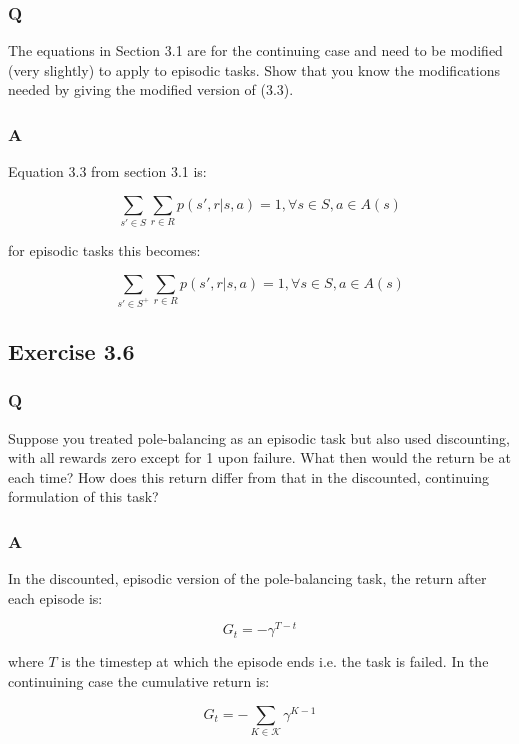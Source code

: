 \subsubsection*{Q}
The equations in Section 3.1 are for the continuing case and need to be modified (very slightly) to apply to episodic tasks. Show that you know the modifications needed by giving the modified version of (3.3). 

\subsubsection*{A}
Equation 3.3 from section 3.1 is:

\begin{equation}
	\sum_{s' \in S} \sum_{r \in R} p(s', r | s, a) = 1, \forall s \in S, a \in A(s)
\end{equation}

for episodic tasks this becomes:

\begin{equation}
\sum_{s' \in S^+} \sum_{r \in R} p(s', r | s, a) = 1, \forall s \in S, a \in A(s)
\end{equation}

\subsection{Exercise 3.6}
\subsubsection*{Q}
Suppose you treated pole-balancing as an episodic task but also used discounting, with all rewards zero except for 1 upon failure. What then would the return be at each time? How does this return differ from that in the discounted, continuing formulation of this task? 

\subsubsection*{A}
In the discounted, episodic version of the pole-balancing task, the return after each episode is:

\begin{equation}
	G_t = -\gamma^{T-t}
\end{equation}

where \(T\) is the timestep at which the episode ends i.e. the task is failed. In the continuining case the cumulative return is:

\begin{equation}
G_t = -\sum_{K\in\mathcal{K}} \gamma^{K-1}
\end{equation}

